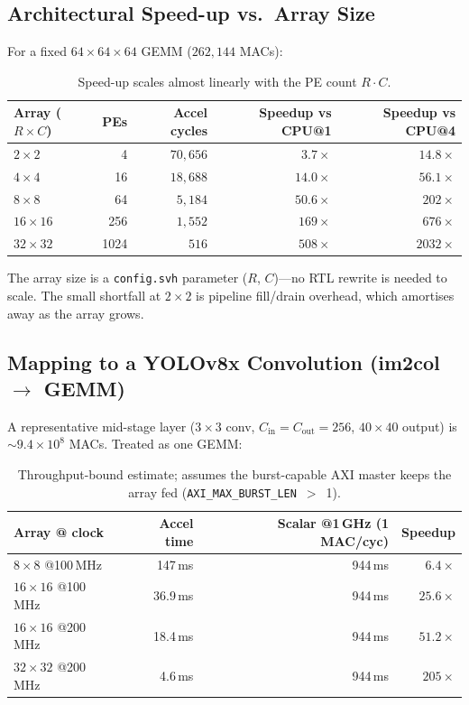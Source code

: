 \subsection{Architectural Speed-up vs.\ Array Size}

For a fixed $64\times64\times64$ GEMM ($262{,}144$ MACs):

\begin{table}[h]
\centering
\begin{tabular}{lrrrr}
\toprule
\textbf{Array ($R\times C$)} & \textbf{PEs} & \textbf{Accel cycles} &
\textbf{Speedup vs CPU@1} & \textbf{Speedup vs CPU@4} \\
\midrule
$2\times2$   & 4    & $70{,}656$ & $3.7\times$  & $14.8\times$ \\
$4\times4$   & 16   & $18{,}688$ & $14.0\times$ & $56.1\times$ \\
$8\times8$   & 64   & $5{,}184$  & $50.6\times$ & $202\times$  \\
$16\times16$ & 256  & $1{,}552$  & $169\times$  & $676\times$  \\
$32\times32$ & 1024 & $516$      & $508\times$  & $2032\times$ \\
\bottomrule
\end{tabular}
\caption{Speed-up scales almost linearly with the PE count $R\cdot C$.}
\end{table}

The array size is a \texttt{config.svh} parameter ($R$, $C$)---no RTL rewrite is
needed to scale. The small shortfall at $2\times2$ is pipeline fill/drain
overhead, which amortises away as the array grows.

\subsection{Mapping to a YOLOv8x Convolution (im2col $\rightarrow$ GEMM)}

A representative mid-stage layer ($3\times3$ conv, $C_\text{in}=C_\text{out}=256$,
$40\times40$ output) is $\sim\!9.4\times10^{8}$ MACs. Treated as one GEMM:

\begin{table}[h]
\centering
\begin{tabular}{lrrr}
\toprule
\textbf{Array @ clock} & \textbf{Accel time} &
\textbf{Scalar @1\,GHz (1 MAC/cyc)} & \textbf{Speedup} \\
\midrule
$8\times8$ @100\,MHz   & 147\,ms  & 944\,ms & $6.4\times$  \\
$16\times16$ @100\,MHz & 36.9\,ms & 944\,ms & $25.6\times$ \\
$16\times16$ @200\,MHz & 18.4\,ms & 944\,ms & $51.2\times$ \\
$32\times32$ @200\,MHz & 4.6\,ms  & 944\,ms & $205\times$  \\
\bottomrule
\end{tabular}
\caption{Throughput-bound estimate; assumes the burst-capable AXI master keeps
the array fed (\texttt{AXI\_MAX\_BURST\_LEN}~$>$~1).}
\end{table}

